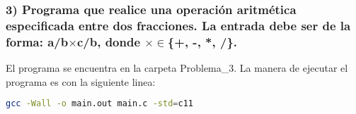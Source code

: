\subsubsection*{3) Programa que realice una operación aritmética especificada entre dos fracciones. La entrada debe ser de la forma: a/b$\times$c/b, donde  $\times \in$\{+, -, *, /\}.}

El programa se encuentra en la carpeta \textcolor{citecolor}{Problema\_3}. La manera de ejecutar el programa es con la siguiente linea:
\begin{lstlisting}[language=bash]
    gcc -Wall -o main.out main.c -std=c11
\end{lstlisting}
